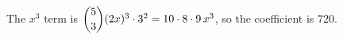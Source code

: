 The $x^3$ term is $\dbinom53(2x)^3\cdot3^2=10\cdot8\cdot9\,x^3$, so the coefficient is $\boxed{720}$.
